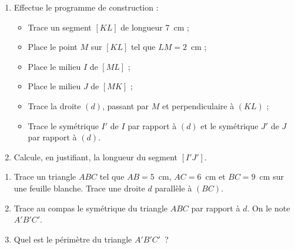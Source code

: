 \begin{exercice}
\begin{enumerate}
 \item Effectue le programme de construction :
 \begin{itemize}
  \item Trace un segment $[KL]$ de longueur 7 cm ;
  \item Place le point $M$ sur $[KL]$ tel que $LM = 2$ cm ;
  \item Place le milieu $I$ de $[ML]$ ;
  \item Place le milieu $J$ de $[MK]$ ;
  \item Trace la droite $(d)$, passant par $M$ et perpendiculaire à $(KL)$ ;
  \item Trace le symétrique $I'$ de $I$ par rapport à $(d)$ et le symétrique $J'$ de $J$ par rapport à $(d)$.
  \end{itemize}
 \item Calcule, en justifiant, la longueur du segment $[I'J']$.
 \end{enumerate}
\end{exercice}

\newpage

\begin{exercice}
\begin{enumerate}
 \item Trace un triangle $ABC$ tel que $AB = 5$ cm, $AC = 6$ cm et $BC = 9$ cm sur une feuille blanche.
Trace une droite $d$ parallèle à $(BC)$.
 \item Trace au compas le symétrique du triangle $ABC$ par rapport à $d$. On le note $A'B'C'$.
 \item Quel est le périmètre du triangle $A'B'C'$ ? 
 \end{enumerate}
\end{exercice}


